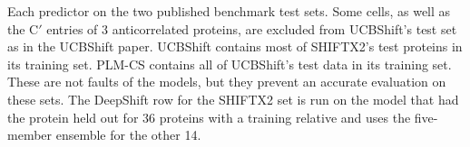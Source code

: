 Each predictor on the two published benchmark test sets. Some cells, as well as the C$'$ entries of 3 anticorrelated proteins, are excluded from UCBShift's test set as in the UCBShift paper\cite{UCBShift}. UCBShift contains most of SHIFTX2's test proteins in its training set. PLM-CS contains all of UCBShift's test data in its training set. These are not faults of the models, but they prevent an accurate evaluation on these sets. The DeepShift row for the SHIFTX2 set is run on the model that had the protein held out for 36 proteins with a training relative and uses the five-member ensemble for the other 14.
